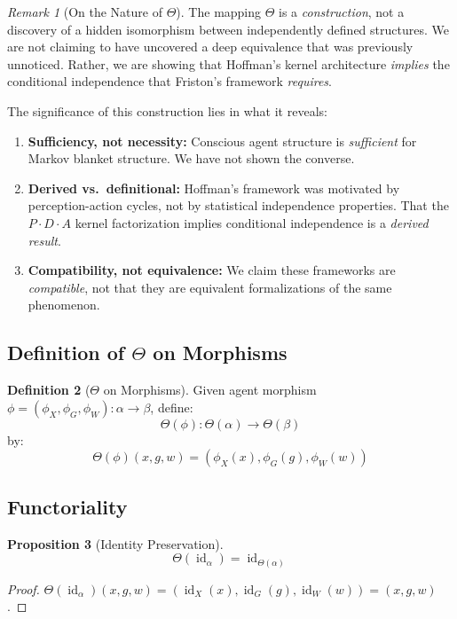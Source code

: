 \documentclass[11pt,a4paper]{article}
\theoremstyle{definition}
\newtheorem{definition}{Definition}[section]
\theoremstyle{plain}
\newtheorem{proposition}[definition]{Proposition}
\theoremstyle{remark}
\newtheorem{remark}[definition]{Remark}
\DeclareMathOperator{\id}{id}
\begin{document}
\begin{remark}[On the Nature of $\Theta$]
The mapping $\Theta$ is a \emph{construction}, not a discovery of a hidden isomorphism between independently defined structures. We are not claiming to have uncovered a deep equivalence that was previously unnoticed. Rather, we are showing that Hoffman's kernel architecture \emph{implies} the conditional independence that Friston's framework \emph{requires}.

The significance of this construction lies in what it reveals:
\begin{enumerate}
    \item \textbf{Sufficiency, not necessity:} Conscious agent structure is \emph{sufficient} for Markov blanket structure. We have not shown the converse.
    \item \textbf{Derived vs.\ definitional:} Hoffman's framework was motivated by perception-action cycles, not by statistical independence properties. That the $P \cdot D \cdot A$ kernel factorization implies conditional independence is a \emph{derived result}.
    \item \textbf{Compatibility, not equivalence:} We claim these frameworks are \emph{compatible}, not that they are equivalent formalizations of the same phenomenon.
\end{enumerate}
\end{remark}

\subsection{Definition of $\Theta$ on Morphisms}

\begin{definition}[$\Theta$ on Morphisms]
Given agent morphism $\phi = (\phi_X, \phi_G, \phi_W): \alpha \to \beta$, define:
\[
\Theta(\phi): \Theta(\alpha) \to \Theta(\beta)
\]
by:
\[
\Theta(\phi)(x, g, w) = (\phi_X(x), \phi_G(g), \phi_W(w))
\]
\end{definition}

\subsection{Functoriality}

\begin{proposition}[Identity Preservation]\label{prop:identity}
\[
\Theta(\id_\alpha) = \id_{\Theta(\alpha)}
\]
\end{proposition}

\begin{proof}
$\Theta(\id_\alpha)(x, g, w) = (\id_X(x), \id_G(g), \id_W(w)) = (x, g, w)$.
\end{proof}
\end{document}
